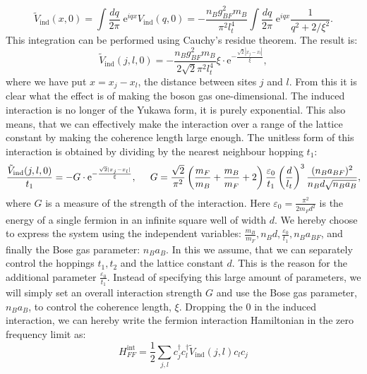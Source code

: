 \begin{equation}
\tilde{V}_{\text{ind}}(x, 0) = \int \frac{dq}{2\pi} \; \text{e}^{iqx}V_{\text{ind}}(q, 0) = -\frac{n_Bg_{BF}^2m_B}{\pi^2l_t^4}\int \frac{dq}{2\pi} \; \text{e}^{iqx} \frac{1}{q^2 + 2/\xi^2}. \nonumber
\end{equation}
This integration can be performed using Cauchy's residue theorem. The result is:
\begin{equation}
\tilde{V}_{\text{ind}}(j, l, 0) = -\frac{n_Bg_{BF}^2m_B}{2\sqrt{2}\pi^2l_t^4}\xi \cdot \text{e}^{-\frac{\sqrt{2}|x_j - x_l|}{\xi}},
\label{eq.Inducedcinteractionrealspace.kitaevchain}
\end{equation}
where we have put $x = x_j - x_l$, the distance between sites $j$ and $l$. From this it is clear what the effect is of making the boson gas one-dimensional. The induced interaction is no longer of the Yukawa form, it is purely exponential. This also means, that we can effectively make the interaction over a range of the lattice constant by making the coherence length large enough. The unitless form of this interaction is obtained by dividing by the nearest neighbour hopping $t_1$:
\begin{equation}
\frac{\tilde{V}_{\text{ind}}(j, l, 0)}{t_1} = -G \cdot \text{e}^{-\frac{\sqrt{2}|x_j - x_l|}{\xi}}, \hspace{0.5cm} G = \frac{\sqrt{2}}{\pi^2} \left(\frac{m_F}{m_B} + \frac{m_B}{m_F} + 2\right)\frac{\varepsilon_0}{t_1}\left(\frac{d}{l_t}\right)^3 \frac{(n_Ba_{BF})^2}{n_Bd\sqrt{n_Ba_B}},
\label{eq.Inducedcinteractionrealspaceunitless.kitaevchain} 
\end{equation}
where $G$ is a measure of the strength of the interaction. Here $\varepsilon_0 = \frac{\pi^2}{2m_Fd^2}$ is the energy of a single fermion in an infinite square well of width $d$. We hereby choose to express the system using the independent variables: $\frac{m_B}{m_F}, n_Bd, \frac{\varepsilon_0}{t_1}, n_B a_{BF}$, and finally the Bose gas parameter: $n_B a_{B}$. In this we assume, that we can separately control the hoppings $t_1, t_2$ and the lattice constant $d$. This is the reason for the additional parameter $\frac{\varepsilon_0}{t_1}$. Instead of specifying this large amount of parameters, we will simply set an overall interaction strength $G$ and use the Bose gas parameter, $n_B a_{B}$, to control the coherence length, $\xi$. Dropping the $0$ in the induced interaction, we can hereby write the fermion interaction Hamiltonian in the zero frequency limit as:
\begin{equation}
H^{\text{int}}_{FF} = \frac{1}{2}\sum_{j,l} c^\dagger_j c^\dagger_l \tilde{V}_{\text{ind}}(j, l) c_l c_j
\label{eq.Hintrealspace.lattice}
\end{equation}
